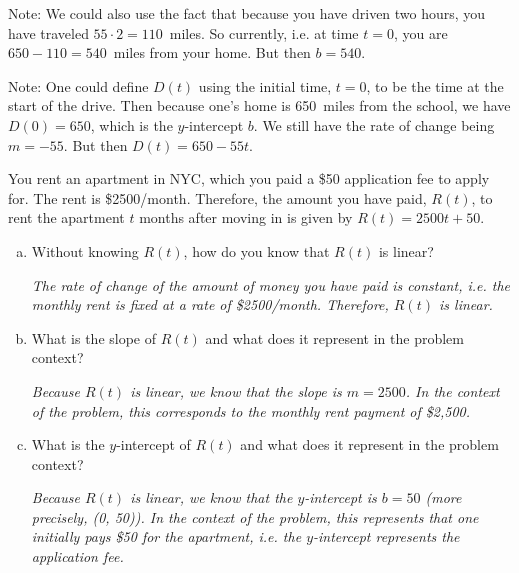 \documentclass[12pt,letterpaper]{exam}
\begin{document}
\begin{questions}
{Note: We could also use the fact that because you have driven two hours, you have traveled $55 \cdot 2= 110$~miles. So currently, i.e. at time $t= 0$, you are $650 - 110= 540$~miles from your home. But then $b= 540$. \pspace

Note: One could define $D(t)$ using the initial time, $t= 0$, to be the time at the start of the drive. Then because one's home is 650~miles from the school, we have $D(0)= 650$, which is the $y$-intercept $b$. We still have the rate of change being $m= -55$. But then $D(t)= 650 - 55t$. 
}



\newpage



\question[8] You rent an apartment in NYC, which you paid a \$50 application fee to apply for. The rent is \$2500/month. Therefore, the amount you have paid, $R(t)$, to rent the apartment $t$ months after moving in is given by $R(t)= 2500t + 50$.
	\begin{enumerate}[(a)]
	\item Without knowing $R(t)$, how do you know that $R(t)$ is linear? \pvspace{2.6cm}
	
	{\itshape The rate of change of the amount of money you have paid is constant, i.e. the monthly rent is fixed at a rate of \$2500/month. Therefore, $R(t)$ is linear.} \pvspace{2.6cm}

	\item What is the slope of $R(t)$ and what does it represent in the problem context? \pvspace{2.6cm}
	
	{\itshape Because $R(t)$ is linear, we know that the slope is $m= 2500$. In the context of the problem, this corresponds to the monthly rent payment of \$2,500.} \pvspace{2.6cm}
	
	\item What is the $y$-intercept of $R(t)$ and what does it represent in the problem context? \pvspace{2.6cm}
	
	{\itshape Because $R(t)$ is linear, we know that the $y$-intercept is $b= 50$ (more precisely, (0, 50)). In the context of the problem, this represents that one initially pays \$50 for the apartment, i.e. the $y$-intercept represents the application fee.}
	\end{enumerate}

\end{questions}
\end{document}
